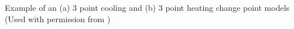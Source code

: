 Example of an (a) 3 point cooling and (b) 3 point heating change point models (Used with permission from \cite{kelly_kissock_measuring_2008})
\label{fig:changepointmodels}